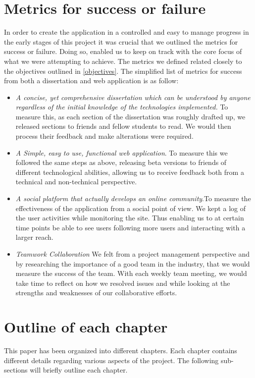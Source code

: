 \section{Metrics for success or failure} \label{metrics}
In order to create the application in a controlled and easy to manage progress in the early stages of this project it was crucial that we outlined the metrics for success or failure. Doing so, enabled us to keep on track with the core focus of what we were attempting to achieve. The metrics we defined related closely to the objectives outlined in \ref{objectives}. The simplified list of metrics for success from both a dissertation and web application is as follow:
\begin{itemize}
  \item \textit{A concise, yet comprehensive dissertation which can be understood by anyone regardless of the initial knowledge of the technologies implemented.} To measure this, as each section of the dissertation was roughly drafted up, we released sections to friends and fellow students to read. We would then process their feedback and make alterations were required.  
  \item \textit{A Simple, easy to use, functional web application}. To measure this we followed the same steps as above, releasing beta versions to friends of different technological abilities, allowing us to receive feedback both from a technical and non-technical perspective.
  \item \textit{A social platform that actually develops an online community}.To measure the effectiveness of the application from a social point of view. We kept a log of the user activities while monitoring the site. Thus enabling us to at certain time points be able to see users following more users and interacting with a larger reach.
  \item \textit{Teamwork Collaboration} We felt from a project management perspective and by researching the importance of a good team in the industry, that we would measure the success of the team. With each weekly team meeting, we would take time to reflect on how we resolved issues and while looking at the strengths and weaknesses of our collaborative efforts. 
\end{itemize}


\section{Outline of each chapter}
This paper has been organized into different chapters. Each chapter contains different details regarding various aspects of the project. The following sub-sections will briefly outline each chapter.

